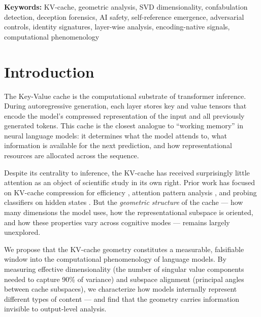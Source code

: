 \documentclass[11pt,a4paper]{article}
\begin{document}
\begin{abstract}
findings. We characterize this as an exploratory study (Campaign 1): several findings are robust, others are promising but underpowered, and we identify the precise methodological gaps that a confirmatory Campaign 2 must address --- including effective rank adversarial controls, natural (non-instructed) deception validation, and cross-architecture replication. Total experimental budget: $\sim$18,000 inferences across 35 hours of GPU time on 3$\times$ RTX 3090.
\end{abstract}

\vspace{0.5em}
\noindent\textbf{Keywords:} KV-cache, geometric analysis, SVD dimensionality, confabulation detection, deception forensics, AI safety, self-reference emergence, adversarial controls, identity signatures, layer-wise analysis, encoding-native signals, computational phenomenology

\section{Introduction}
\label{sec:intro}

The Key-Value cache is the computational substrate of transformer inference. During autoregressive generation, each layer stores key and value tensors that encode the model's compressed representation of the input and all previously generated tokens. This cache is the closest analogue to ``working memory'' in neural language models: it determines what the model attends to, what information is available for the next prediction, and how representational resources are allocated across the sequence.

Despite its centrality to inference, the KV-cache has received surprisingly little attention as an object of scientific study in its own right. Prior work has focused on KV-cache compression for efficiency \citep{liu2024kivi, zhang2024h2o}, attention pattern analysis \citep{clark2019does}, and probing classifiers on hidden states \citep{belinkov2022probing}. But the \emph{geometric structure} of the cache --- how many dimensions the model uses, how the representational subspace is oriented, and how these properties vary across cognitive modes --- remains largely unexplored.

We propose that the KV-cache geometry constitutes a measurable, falsifiable window into the computational phenomenology of language models. By measuring effective dimensionality (the number of singular value components needed to capture 90\% of variance) and subspace alignment (principal angles between cache subspaces), we characterize how models internally represent different types of content --- and find that the geometry carries information invisible to output-level analysis.
\end{document}
